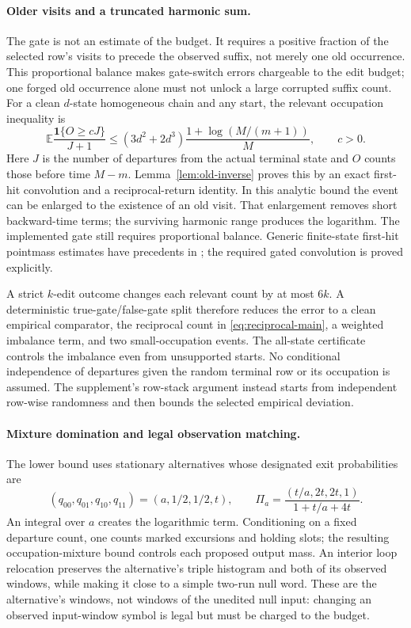 \documentclass[11pt,letterpaper]{article}
\newcommand{\E}{\mathbb E}
\newcommand{\ind}{\mathbf 1}
\theoremstyle{definition}
\theoremstyle{remark}
\numberwithin{equation}{section}
\begin{document}
\paragraph{Older visits and a truncated harmonic sum.}
The gate is not an estimate of the budget. It requires a positive fraction of the selected row's visits to precede the observed suffix, not merely one old occurrence. This proportional balance makes gate-switch errors chargeable to the edit budget; one forged old occurrence alone must not unlock a large corrupted suffix count. For a clean $d$-state homogeneous chain and any start, the relevant occupation inequality is
\begin{equation}\label{eq:reciprocal-main}
 \E\frac{\ind\{O\ge cJ\}}{J+1}
 \le(3d^2+2d^3)\frac{1+\log(M/(m+1))}{M},\qquad c>0.
\end{equation}
Here $J$ is the number of departures from the actual terminal state and $O$ counts those before time $M-m$. Lemma~\ref{lem:old-inverse} proves this by an exact first-hit convolution and a reciprocal-return identity. In this analytic bound the event can be enlarged to the existence of an old visit. That enlargement removes short backward-time terms; the surviving harmonic range produces the logarithm. The implemented gate still requires proportional balance. Generic finite-state first-hit pointmass estimates have precedents in \citet{NorrisPeresZhai2014}; the required gated convolution is proved explicitly.

A strict $k$-edit outcome changes each relevant count by at most $6k$. A deterministic true-gate/false-gate split therefore reduces the error to a clean empirical comparator, the reciprocal count in \eqref{eq:reciprocal-main}, a weighted imbalance term, and two small-occupation events. The all-state certificate controls the imbalance even from unsupported starts. No conditional independence of departures given the random terminal row or its occupation is assumed. The supplement's row-stack argument instead starts from independent row-wise randomness and then bounds the selected empirical deviation.

\paragraph{Mixture domination and legal observation matching.}
The lower bound uses stationary alternatives whose designated exit probabilities are
\[
 (q_{00},q_{01},q_{10},q_{11})=(a,1/2,1/2,t),\qquad
 \Pi_a=\frac{(t/a,2t,2t,1)}{1+t/a+4t}.
\]
An integral over $a$ creates the logarithmic term. Conditioning on a fixed departure count, one counts marked excursions and holding slots; the resulting occupation-mixture bound controls each proposed output mass. An interior loop relocation preserves the alternative's triple histogram and both of its observed windows, while making it close to a simple two-run null word. These are the alternative's windows, not windows of the unedited null input: changing an observed input-window symbol is legal but must be charged to the budget.
\end{document}
